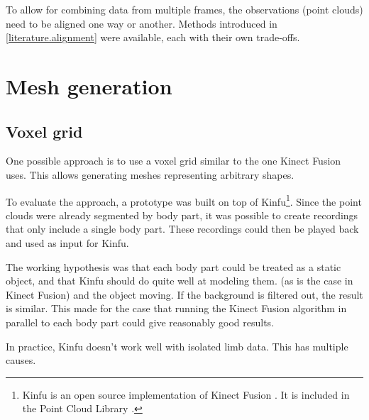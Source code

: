To allow for combining data from multiple frames, the observations (point clouds) need to be aligned one way or another. Methods introduced in \autoref{literature.alignment} were available, each with their own trade-offs.


\section{Mesh generation}


\subsection{Voxel grid}

One possible approach is to use a voxel grid similar to the one Kinect Fusion \citep{} uses. This allows generating meshes representing arbitrary shapes.

To evaluate the approach, a prototype was built on top of Kinfu\footnote{Kinfu is an open source implementation of Kinect Fusion \citep{newcombe2011kinectfusion}. It is included in the Point Cloud Library \citep{PCL}.}. Since the point clouds were already segmented by body part, it was possible to create recordings that only include a single body part. These recordings could then be played back and used as input for Kinfu.

The working hypothesis was that each body part could be treated as a static object, and that Kinfu should do quite well at modeling them.  (as is the case in Kinect Fusion) and the object moving. If the background is filtered out, the result is similar. This made for the case that running the Kinect Fusion algorithm in parallel to each body part could give reasonably good results.

In practice, Kinfu doesn't work well with isolated limb data. This has multiple causes. 

